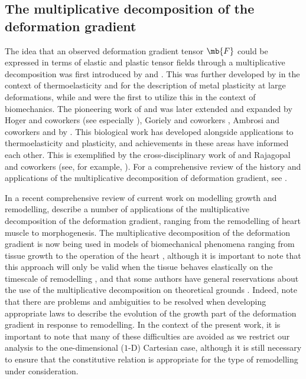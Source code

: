 \subsection{The multiplicative decomposition of the deformation gradient}
\label{SS:MultiDecomp}

The idea that an observed deformation gradient tensor $\mb{F}$ could be expressed in terms of elastic and plastic tensor fields through a multiplicative decomposition was first introduced by \citet{Bilby1957} and \citet{Kroner1958,Kroner1959}. This was further developed by \citet{Stojanovic1964,Stojanovic1970} in the context of thermoelasticity and \citet{Lee1969} for the description of metal plasticity at large deformations, while \citet{Rodriguez1994} and \citet{CookThesis} were the first to utilize this in the context of biomechanics. The pioneering work of \citet{Rodriguez1994} and \citet{CookThesis} was later extended and expanded by Hoger and coworkers (see especially \citet{Chen2000}), Goriely and coworkers \citep{BenAmar2005,Goriely2007,Goriely2008}, Ambrosi and coworkers \citep{Ambrosi2004,Ambrosi2007a,Ambrosi2007b} and by \citet{VandiverThesis}. This biological work has developed alongside applications to thermoelasticity and plasticity, and achievements in these areas have informed each other. This is exemplified by the cross-disciplinary work of \citet{LubardaElastoPlast,Lubarda2004} and Rajagopal and coworkers (see, for example, \citet{Rajagopal2004}). For a comprehensive review of the history and applications of the multiplicative decomposition of deformation gradient, see \citet{Lubarda2004}.

In a recent comprehensive review of current work on modelling growth and remodelling, \citet{Ambrosi2011} describe a number of applications of the multiplicative decomposition of the deformation gradient, ranging from the remodelling of heart muscle to morphogenesis. The multiplicative decomposition of the deformation gradient is now being used in models of biomechanical phenomena ranging from tissue growth \citep{BenAmar2005} to the operation of the heart \citep{Goktepe2010,Rausch2011}, although it is important to note that this approach will only be valid when the tissue behaves elastically on the timescale of remodelling \citep{WynJones2012}, and that some authors have general reservations about the use of the multiplicative decomposition on theoretical grounds \citep{Xiao2006}. Indeed, \citet{Ambrosi2011} note that there are problems and ambiguities to be resolved when developing appropriate laws to describe the evolution of the growth part of the deformation gradient in response to remodelling. In the context of the present work, it is important to note that many of these difficulties are avoided as we restrict our analysis to the one-dimensional ($1$-D) Cartesian case, although it is still necessary to ensure that the constitutive relation is appropriate for the type of remodelling under consideration.

